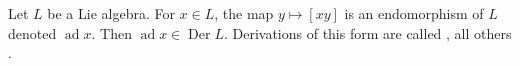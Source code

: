 Let $L$ be a Lie algebra. For $x \in L$, the map $y \mapsto [xy]$ is an endomorphism of $L$ denoted $\operatorname{ad} x$. Then $\operatorname{ad} x \in \operatorname{Der} L$. Derivations of this form are called , all others .
